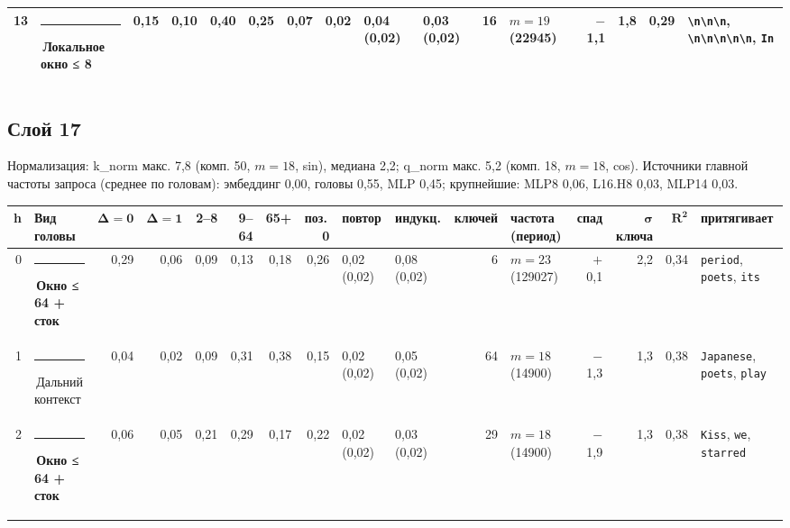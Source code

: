 \documentclass[10pt]{article}
\begin{document}
\begin{minipage}{\linewidth}
\begin{center}
{\begin{tabular}{|r|l|r|r|r|r|r|r|l|l|r|l|r|r|r|l|}
13 & \textcolor[HTML]{1BAF7A}{\rule{0.62em}{0.62em}}\,\textbf{Локальное окно ≤ 8} & 0,15 & 0,10 & 0,40 & 0,25 & 0,07 & 0,02 & 0,04 (0,02) & 0,03 (0,02) & 16 & $m{=}19$ (22945) & $-$1,1 & 1,8 & 0,29 & \texttt{\textvisiblespace{}\textbackslash{}n\textbackslash{}n\textbackslash{}n}, \texttt{\textbackslash{}n\textbackslash{}n\textbackslash{}n\textbackslash{}n\textbackslash{}n}, \texttt{\textvisiblespace{}In} \\ \hline
\hline\end{tabular}}\end{center}
\end{minipage}
\par\vspace{0.4em}
\noindent\begin{minipage}{\linewidth}
\subsection*{Слой 17}
{\small\color{ink2} Нормализация: k\_norm макс. 7,8 (комп. 50, $m{=}18$, sin), медиана 2,2; q\_norm макс. 5,2 (комп. 18, $m{=}18$, cos). Источники главной частоты запроса (среднее по головам): эмбеддинг 0,00, головы 0,55, MLP 0,45; крупнейшие: MLP8 0,06, L16.H8 0,03, MLP14 0,03.}
\begin{center}{\footnotesize\begin{tabular}{|r|l|r|r|r|r|r|r|l|l|r|l|r|r|r|l|}
\hline
\rowcolor{head}\textbf{h} & \textbf{Вид головы} & $\boldsymbol{\Delta{=}0}$ & $\boldsymbol{\Delta{=}1}$ & \textbf{2–8} & \textbf{9–64} & \textbf{65+} & \textbf{поз.\,0} & \textbf{повтор} & \textbf{индукц.} & \textbf{ключей} & \textbf{частота (период)} & \textbf{спад} & $\boldsymbol{\sigma}$ \textbf{ключа} & $\boldsymbol{R^2}$ & \textbf{притягивает} \\ \hline
0 & \textcolor[HTML]{EDA100}{\rule{0.62em}{0.62em}}\,\textbf{Окно ≤ 64 + сток} & 0,29 & 0,06 & 0,09 & 0,13 & 0,18 & 0,26 & 0,02 (0,02) & 0,08 (0,02) & 6 & $m{=}23$ (129027) & $+$0,1 & 2,2 & 0,34 & \texttt{\textvisiblespace{}period}, \texttt{\textvisiblespace{}poets}, \texttt{\textvisiblespace{}its} \\ \hline
1 & \textcolor[HTML]{C3C2B7}{\rule{0.62em}{0.62em}}\,Дальний контекст & 0,04 & 0,02 & 0,09 & 0,31 & 0,38 & 0,15 & 0,02 (0,02) & 0,05 (0,02) & 64 & $m{=}18$ (14900) & $-$1,3 & 1,3 & 0,38 & \texttt{\textvisiblespace{}Japanese}, \texttt{\textvisiblespace{}poets}, \texttt{\textvisiblespace{}play} \\ \hline
2 & \textcolor[HTML]{EDA100}{\rule{0.62em}{0.62em}}\,\textbf{Окно ≤ 64 + сток} & 0,06 & 0,05 & 0,21 & 0,29 & 0,17 & 0,22 & 0,02 (0,02) & 0,03 (0,02) & 29 & $m{=}18$ (14900) & $-$1,9 & 1,3 & 0,38 & \texttt{\textvisiblespace{}Kiss}, \texttt{\textvisiblespace{}we}, \texttt{\textvisiblespace{}starred} \\ \hline

\end{tabular}}
\end{center}
\end{minipage}
\end{document}

